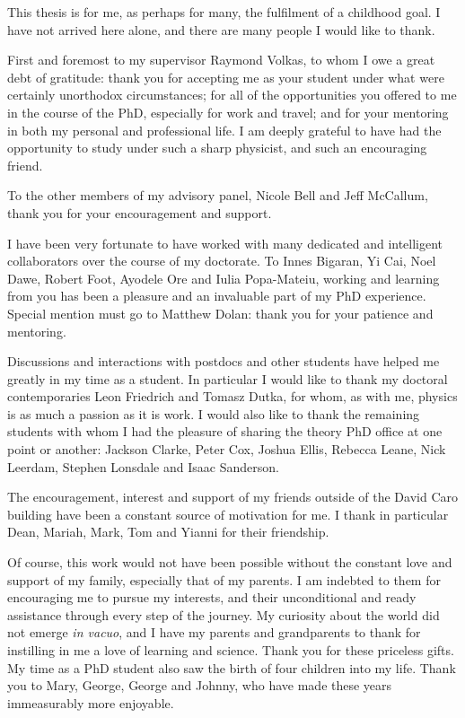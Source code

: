 \begin{acknowledgements}
  This thesis is for me, as perhaps for many, the fulfilment of a childhood
  goal. I have not arrived here alone, and there are many people I would like to
  thank.

  First and foremost to my supervisor Raymond Volkas, to whom I owe a great debt
  of gratitude: thank you for accepting me as your student under what were
  certainly unorthodox circumstances; for all of the opportunities you offered
  to me in the course of the PhD, especially for work and travel; and for your
  mentoring in both my personal and professional life. I am deeply grateful to
  have had the opportunity to study under such a sharp physicist, and such an
  encouraging friend.

  To the other members of my advisory panel, Nicole Bell and Jeff McCallum,
  thank you for your encouragement and support.

  I have been very fortunate to have worked with many dedicated and intelligent
  collaborators over the course of my doctorate. To Innes Bigaran, Yi Cai, Noel
  Dawe, Robert Foot, Ayodele Ore and Iulia Popa-Mateiu, working and learning
  from you has been a pleasure and an invaluable part of my PhD experience.
  Special mention must go to Matthew Dolan: thank you for your patience and
  mentoring.

  Discussions and interactions with postdocs and other students have helped me
  greatly in my time as a student. In particular I would like to thank my
  doctoral contemporaries Leon Friedrich and Tomasz Dutka, for whom, as with me,
  physics is as much a passion as it is work. I would also like to thank the
  remaining students with whom I had the pleasure of sharing the theory PhD
  office at one point or another: Jackson Clarke, Peter Cox, Joshua Ellis,
  Rebecca Leane, Nick Leerdam, Stephen Lonsdale and Isaac Sanderson.

  The encouragement, interest and support of my friends outside of the David
  Caro building have been a constant source of motivation for me. I thank in
  particular Dean, Mariah, Mark, Tom and Yianni for their friendship.

  Of course, this work would not have been possible without the constant love
  and support of my family, especially that of my parents. I am indebted to them
  for encouraging me to pursue my interests, and their unconditional and ready
  assistance through every step of the journey. My curiosity about the world did
  not emerge \textit{in vacuo}, and I have my parents and grandparents to thank
  for instilling in me a love of learning and science. Thank you for these
  priceless gifts. My time as a PhD student also saw the birth of four children
  into my life. Thank you to Mary, George, George and Johnny, who have made
  these years immeasurably more enjoyable.


\end{acknowledgements}
